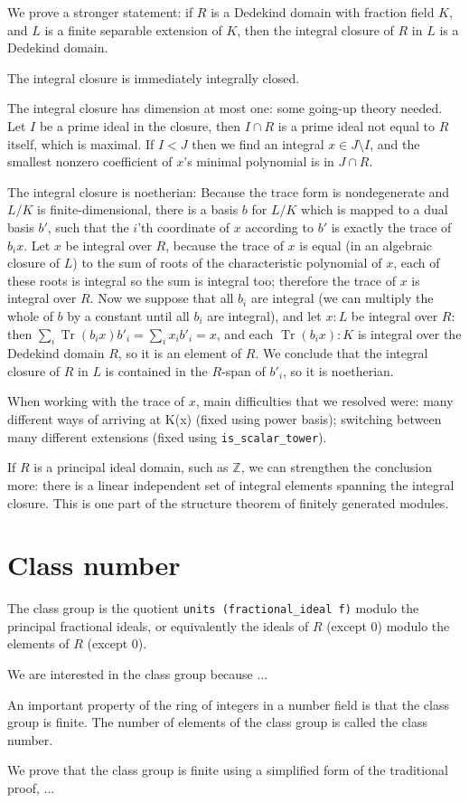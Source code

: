 \documentclass{lipics-v2021}
\newcommand{\lean}[1]{\texttt{#1}\xspace} %
\DeclareMathOperator{\Tr}{\mathrm{Tr}}
\newcommand{\Z}{\mathbb{Z}}
\begin{document}
We prove a stronger statement: if $R$ is a Dedekind domain with fraction field $K$, and $L$ is a finite separable extension of $K$, then the integral closure of $R$ in $L$ is a Dedekind domain.

The integral closure is immediately integrally closed.

The integral closure has dimension at most one: some going-up theory needed. Let $I$ be a prime ideal in the closure, then $I \cap R$ is a prime ideal not equal to $R$ itself, which is maximal. If $I < J$ then we find an integral $x \in J \setminus I$, and the smallest nonzero coefficient of $x$'s minimal polynomial is in $J \cap R$.

The integral closure is noetherian: Because the trace form is nondegenerate and $L / K$ is finite-dimensional, there is a basis $b$ for $L / K$ which is mapped to a dual basis $b'$, such that the $i$'th coordinate of $x$ according to $b'$ is exactly the trace of $b_i x$. Let $x$ be integral over $R$, because the trace of $x$ is equal (in an algebraic closure of $L$) to the sum of roots of the characteristic polynomial of $x$, each of these roots is integral so the sum is integral too; therefore the trace of $x$ is integral over $R$. Now we suppose that all $b_i$ are integral (we can multiply the whole of $b$ by a constant until all $b_i$ are integral), and let $x : L$ be integral over $R$: then $\sum_i \Tr(b_i x) b'_i = \sum_i x_i b'_i = x$, and each $\Tr(b_i x) : K$ is integral over the Dedekind domain $R$, so it is an element of $R$. We conclude that the integral closure of $R$ in $L$ is contained in the $R$-span of $b'_i$, so it is noetherian.

When working with the trace of $x$, main difficulties that we resolved were: many different ways of arriving at K(x) (fixed using power basis); switching between many different extensions (fixed using \lean{is\_scalar\_tower}).

If $R$ is a principal ideal domain, such as $\Z$, we can strengthen the conclusion more: there is a linear independent set of integral elements spanning the integral closure. This is one part of the structure theorem of finitely generated modules.

\section{Class number}

The class group is the quotient \lean{units (fractional\_ideal f)} modulo the principal fractional ideals, or equivalently the ideals of $R$ (except $0$) modulo the elements of $R$ (except $0$).

We are interested in the class group because ...

An important property of the ring of integers in a number field is that the class group is finite. The number of elements of the class group is called the class number.

We prove that the class group is finite using a simplified form of the traditional proof, ...
\end{document}
